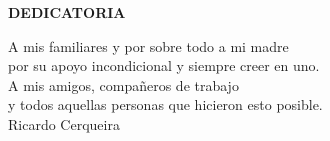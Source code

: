 \begin{center}
	\large{\textbf{DEDICATORIA}}
\end{center}

















\hspace{0pt}
\vfill



\begin{flushright}
\setlength{\parskip}{10mm}
A mis familiares y por sobre todo a mi madre\\

por su apoyo incondicional y siempre creer en uno.\\


A mis amigos, compañeros de trabajo\\
y todos aquellas personas que hicieron esto posible.\\

Ricardo Cerqueira\\
\setlength{\parskip}{0mm}
\end{flushright}

\vfill
\hspace{0pt}
